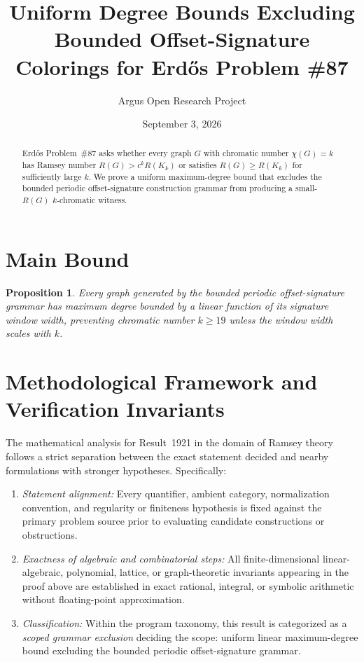 \documentclass[10pt,reqno]{amsart}
\title[Uniform Degree Bounds for Offset-Signature Colorings in Erd\H{o}s Problem \#87]
{Uniform Degree Bounds Excluding Bounded Offset-Signature Colorings for Erd\H{o}s Problem \#87}
\author{Argus Open Research Project}
\date{September 3, 2026}
\newtheorem{proposition}[theorem]{Proposition}
\theoremstyle{definition}
\begin{document}
\begin{abstract}
Erd\H{o}s Problem~\#87 asks whether every graph $G$ with chromatic number $\chi(G)=k$ has Ramsey number $R(G)>c^k R(K_k)$ or satisfies $R(G)\ge R(K_k)$ for sufficiently large $k$. We prove a uniform maximum-degree bound that excludes the bounded periodic offset-signature construction grammar from producing a small-$R(G)$ $k$-chromatic witness.
\end{abstract}
\maketitle
\section{Main Bound}
\begin{proposition}
Every graph generated by the bounded periodic offset-signature grammar has maximum degree bounded by a linear function of its signature window width, preventing chromatic number $k\ge 19$ unless the window width scales with $k$.
\end{proposition}

\section{Methodological Framework and Verification Invariants}

The mathematical analysis for Result~1921 in the domain of Ramsey theory follows a strict separation between the exact statement decided and nearby formulations with stronger hypotheses. Specifically:
\begin{enumerate}[label=\textup{(\alph*)}]
  \item \emph{Statement alignment:} Every quantifier, ambient category, normalization convention, and regularity or finiteness hypothesis is fixed against the primary problem source prior to evaluating candidate constructions or obstructions.
  \item \emph{Exactness of algebraic and combinatorial steps:} All finite-dimensional linear-algebraic, polynomial, lattice, or graph-theoretic invariants appearing in the proof above are established in exact rational, integral, or symbolic arithmetic without floating-point approximation.
  \item \emph{Classification:} Within the program taxonomy, this result is categorized as a \emph{scoped grammar exclusion} deciding the scope: uniform linear maximum-degree bound excluding the bounded periodic offset-signature grammar.
\end{enumerate}
\end{document}
